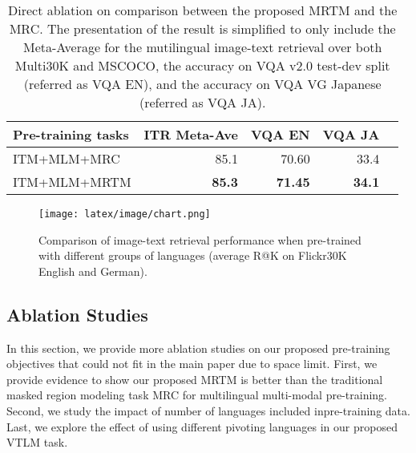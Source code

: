 \documentclass[final]{cvpr}
\newcommand{\luowei}[1]{\textcolor{cyan}{\small{\bf [Luowei: #1 ]}}}
\newcommand{\mingyang}[1]{\textcolor{brown}{\small{\bf [Mingyang: #1 ]}}}
\newcommand{\linjie}[1]{\textcolor{asparagus}{\small{\bf [Linjie: #1 ]}}}
\begin{document}
\begin{table}[h!]
\centering
\small
\begin{tabular}{l|r|rrr}
\hline
Pre-training tasks  & ITR Meta-Ave  & VQA EN & VQA JA \\ 
\hline
ITM+MLM+MRC & 85.1 & 70.60 & 33.4 \\ \hline
ITM+MLM+MRTM & \textbf{85.3}& \textbf{71.45}& \textbf{34.1}\\ \hline


\end{tabular}
\caption{\label{tab:more_abs} Direct ablation on comparison between the proposed MRTM and the MRC. The presentation of the result is simplified to only include the Meta-Average for the mutilingual image-text retrieval over both Multi30K and MSCOCO, the accuracy on VQA v2.0 test-dev split (referred as VQA EN), and the accuracy on VQA VG Japanese (referred as VQA JA). }
\end{table}

\begin{figure}[h!]
\centering
\texttt{[image: latex/image/chart.png]}
\vspace{-3mm}
\caption{Comparison of image-text retrieval performance when pre-trained with different groups of languages (average R@K on Flickr30K English and German).} %
\label{fig:1}
\end{figure}

\subsection{Ablation Studies} \label{sec: more ablation}
In this section, we provide more ablation studies on our proposed pre-training objectives that could not fit in the main paper due to space limit. First, we provide evidence to show our proposed MRTM is better than the traditional masked region modeling task MRC for multilingual multi-modal pre-training. Second, we study the impact of number of languages included inpre-training data. Last, we explore the effect of using different pivoting languages in our proposed VTLM task. 
\end{document}
